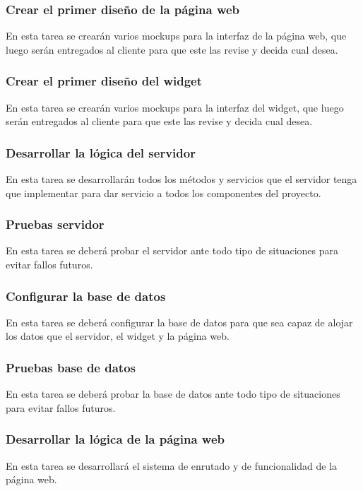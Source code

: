 \subsubsection{Crear el primer diseño de la página web}
En esta tarea se crearán varios mockups para la interfaz de la página web, que luego serán entregados al cliente para que este las revise y decida cual desea.

\subsubsection{Crear el primer diseño del widget}
En esta tarea se crearán varios mockups para la interfaz del widget, que luego serán entregados al cliente para que este las revise y decida cual desea.

\subsubsection{Desarrollar la lógica del servidor}
En esta tarea se desarrollarán todos los métodos y servicios que el servidor tenga que implementar para dar servicio a todos los componentes del proyecto.

\subsubsection{Pruebas servidor}
En esta tarea se deberá probar el servidor ante todo tipo de situaciones para evitar fallos futuros.

\subsubsection{Configurar la base de datos}
En esta tarea se deberá configurar la base de datos para que sea capaz de alojar los datos que el servidor, el widget y la página web.

\subsubsection{Pruebas base de datos}
En esta tarea se deberá probar la base de datos ante todo tipo de situaciones para evitar fallos futuros.

\subsubsection{Desarrollar la lógica de la página web}
En esta tarea se desarrollará el sistema de enrutado y de funcionalidad de la página web.

